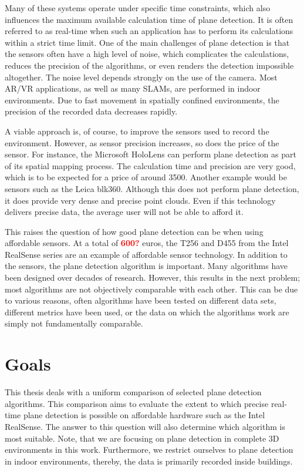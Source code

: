 \documentclass[main.tex]{subfiles}
\begin{document}
Many of these systems operate under specific time constraints, which also influences the maximum available calculation time of plane detection. 
It is often referred to as real-time when such an application has to perform its calculations within a strict time limit. 
One of the main challenges of plane detection is that the sensors often have a high level of noise, which complicates the calculations, 
reduces the precision of the algorithms, or even renders the detection impossible altogether. The noise level depends strongly on the use of the camera. 
Most AR/VR applications, as well as many SLAMs, are performed in indoor environments. 
Due to fast movement in spatially confined environments, the precision of the recorded data decreases rapidly.

A viable approach is, of course, to improve the sensors used to record the environment. However, as sensor precision increases, so does the price of the sensor. 
For instance, the Microsoft HoloLens can perform plane detection as part of its spatial mapping process. 
The calculation time and precision are very good, which is to be expected for a price of around 3500. Another example would be sensors such as the Leica blk360. 
Although this does not perform plane detection, it does provide very dense and precise point clouds. Even if this technology delivers precise data, 
the average user will not be able to afford it.

This raises the question of how good plane detection can be when using affordable sensors. 
At a total of \textbf{\textcolor{red}{600?}} euros, the T256 and D455 from the Intel RealSense series are an example of affordable sensor technology. 
In addition to the sensors, the plane detection algorithm is important. Many algorithms have been designed over decades of research. 
However, this results in the next problem; most algorithms are not objectively comparable with each other. 
This can be due to various reasons, often algorithms have been tested on different data sets, different metrics have been used, 
or the data on which the algorithms work are simply not fundamentally comparable. 


\section{Goals}

This thesis deals with a uniform comparison of selected plane detection algorithms. 
This comparison aims to evaluate the extent to which precise real-time plane detection is possible on affordable hardware such as the Intel RealSense. 
The answer to this question will also determine which algorithm is most suitable.
Note, that we are focusing on plane detection in complete 3D environments in this work. 
Furthermore, we restrict ourselves to plane detection in indoor environments, thereby, the data is primarily recorded inside buildings. 
\end{document}

